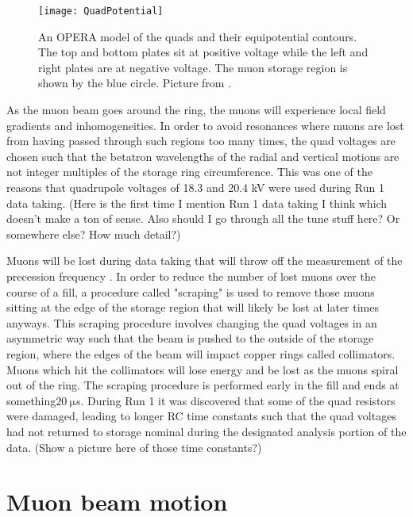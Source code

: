 \begin{figure}[]
    \centering
    \texttt{[image: QuadPotential]}
    \caption[Electrostatic quadrupole potentials]{An OPERA model of the quads and their equipotential contours. The top and bottom plates sit at positive voltage while the left and right plates are at negative voltage. The muon storage region is shown by the blue circle. Picture from .}   
    \label{fig:QuadPotential}
\end{figure}


As the muon beam goes around the ring, the muons will experience local field gradients and inhomogeneities. In order to avoid resonances where muons are lost from having passed through such regions too many times, the quad voltages are chosen such that the betatron wavelengths of the radial and vertical motions are not integer multiples of the storage ring circumference. This was one of the reasons that quadrupole voltages of 18.3 and 20.4 kV were used during Run 1 data taking. (Here is the first time I mention Run 1 data taking I think which doesn't make a ton of sense. Also should I go through all the tune stuff here? Or somewhere else? How much detail?) 


Muons will be lost during data taking that will throw off the measurement of the precession frequency \wa. In order to reduce the number of lost muons over the course of a fill, a procedure called "scraping" is used to remove those muons sitting at the edge of the storage region that will likely be lost at later times anyways. This scraping procedure involves changing the quad voltages in an asymmetric way such that the beam is pushed to the outside of the storage region, where the edges of the beam will impact copper rings called collimators. Muons which hit the collimators will lose energy and be lost as the muons spiral out of the ring. The scraping procedure is performed early in the fill and ends at something$\SI{20}{\micro s}$. During Run 1 it was discovered that some of the quad resistors were damaged, leading to longer RC time constants such that the quad voltages had not returned to storage nominal during the designated analysis portion of the data. (Show a picture here of those time constants?)


\section{Muon beam motion}


